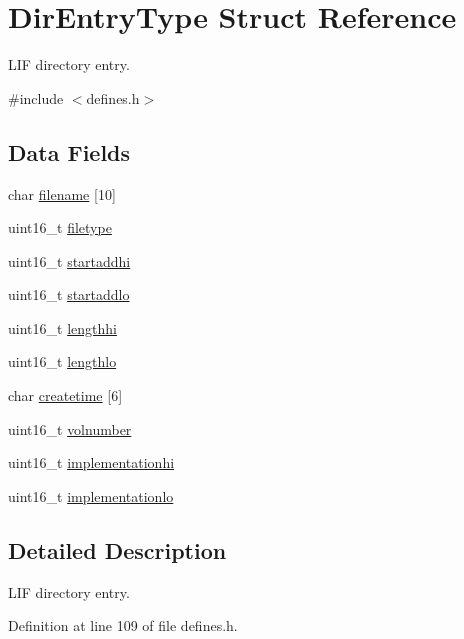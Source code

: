 \hypertarget{structDirEntryType}{}\section{Dir\+Entry\+Type Struct Reference}
\label{structDirEntryType}


L\+IF directory entry.  




{\ttfamily \#include $<$defines.\+h$>$}

\subsection*{Data Fields}
\begin{DoxyCompactItemize}
\item 
char \hyperlink{structDirEntryType_aa60fae0a6b7ba9c966cbcf46e555f396}{filename} \mbox{[}10\mbox{]}
\item 
uint16\+\_\+t \hyperlink{structDirEntryType_ada14562440087858ebf04bc4c81eedd2}{filetype}
\item 
uint16\+\_\+t \hyperlink{structDirEntryType_a0cab2915e9f864e25b24d298c36c11db}{startaddhi}
\item 
uint16\+\_\+t \hyperlink{structDirEntryType_aea0e798bb172b4bddf174ce339a4a54a}{startaddlo}
\item 
uint16\+\_\+t \hyperlink{structDirEntryType_ad7aaba7b01038bc8bacb096bd66fff08}{lengthhi}
\item 
uint16\+\_\+t \hyperlink{structDirEntryType_ad1cde25a0229866557cd5983c27fbd31}{lengthlo}
\item 
char \hyperlink{structDirEntryType_a627fd55537c73d4fee596b140e106c01}{createtime} \mbox{[}6\mbox{]}
\item 
uint16\+\_\+t \hyperlink{structDirEntryType_add9ab11f89586efb100471f6580e75c5}{volnumber}
\item 
uint16\+\_\+t \hyperlink{structDirEntryType_a27a15eea3264d44c9e93e3be77093151}{implementationhi}
\item 
uint16\+\_\+t \hyperlink{structDirEntryType_a8164d577c06fb7c312aaa4955d491449}{implementationlo}
\end{DoxyCompactItemize}


\subsection{Detailed Description}
L\+IF directory entry. 

Definition at line 109 of file defines.\+h.



